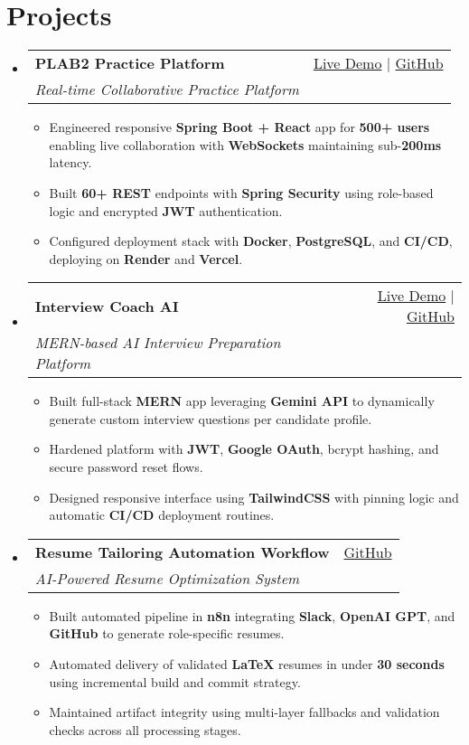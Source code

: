 \documentclass[letterpaper,11pt]{article}
\makeatletter
\newcommand{\resumeItem}[1]{\item\small{#1 \vspace{-2pt}}}
\newcommand{\resumeSubheading}[4]{
  \vspace{-1pt}\item
    \begin{tabular*}{0.97\textwidth}[t]{l@{\extracolsep{\fill}}r}
      \textbf{#1} & #2 \\
      \textit{\small#3} & \textit{\small #4} \\
    \end{tabular*}\vspace{-5pt}
}
\newcommand{\resumeSubHeadingListStart}{\begin{itemize}[leftmargin=*]}
\newcommand{\resumeSubHeadingListEnd}{\end{itemize}}
\newcommand{\resumeItemListStart}{\begin{itemize}}
\newcommand{\resumeItemListEnd}{\end{itemize}\vspace{-5pt}}
\makeatother
\begin{document}
\section{Projects}
  \resumeSubHeadingListStart
    \resumeSubheading
      {\textbf{PLAB2 Practice Platform}}{\href{https://plab2practice.com}{Live Demo} | \href{https://github.com/altansaid/plab2projectnew}{GitHub}}
      {Real-time Collaborative Practice Platform}{}
      \resumeItemListStart
        \resumeItem{Engineered responsive \textbf{Spring Boot + React} app for \textbf{500+ users} enabling live collaboration with \textbf{WebSockets} maintaining sub-\textbf{200ms} latency.}
        \resumeItem{Built \textbf{60+ REST} endpoints with \textbf{Spring Security} using role-based logic and encrypted \textbf{JWT} authentication.}
        \resumeItem{Configured deployment stack with \textbf{Docker}, \textbf{PostgreSQL}, and \textbf{CI/CD}, deploying on \textbf{Render} and \textbf{Vercel}.}
      \resumeItemListEnd

    \resumeSubheading
      {\textbf{Interview Coach AI}}{\href{https://interviewcoach-ai.vercel.app/}{Live Demo} | \href{https://github.com/altansaid/interviewcoach-ai}{GitHub}}
      {MERN-based AI Interview Preparation Platform}{}
      \resumeItemListStart
        \resumeItem{Built full-stack \textbf{MERN} app leveraging \textbf{Gemini API} to dynamically generate custom interview questions per candidate profile.}
        \resumeItem{Hardened platform with \textbf{JWT}, \textbf{Google OAuth}, bcrypt hashing, and secure password reset flows.}
        \resumeItem{Designed responsive interface using \textbf{TailwindCSS} with pinning logic and automatic \textbf{CI/CD} deployment routines.}
      \resumeItemListEnd

    \resumeSubheading
      {\textbf{Resume Tailoring Automation Workflow}}{\href{https://github.com/altansaid/resume-automation-workflow}{GitHub}}
      {AI-Powered Resume Optimization System}{}
      \resumeItemListStart
        \resumeItem{Built automated pipeline in \textbf{n8n} integrating \textbf{Slack}, \textbf{OpenAI GPT}, and \textbf{GitHub} to generate role-specific resumes.}
        \resumeItem{Automated delivery of validated \textbf{LaTeX} resumes in under \textbf{30 seconds} using incremental build and commit strategy.}
        \resumeItem{Maintained artifact integrity using multi-layer fallbacks and validation checks across all processing stages.}
      \resumeItemListEnd
  \resumeSubHeadingListEnd

\end{document}
